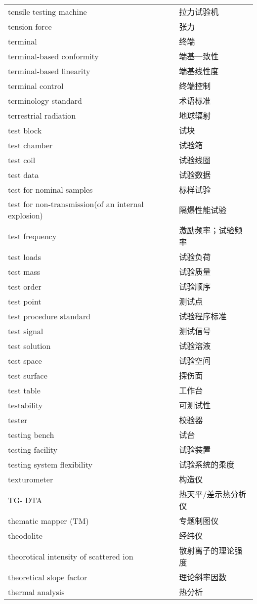 \documentclass[
]{article}
\begin{document}
\begin{longtable}[]{@{}ll@{}}
tensile testing machine & 拉力试验机 \\
tension force & 张力 \\
terminal & 终端 \\
terminal-based conformity & 端基一致性 \\
terminal-based linearity & 端基线性度 \\
terminal control & 终端控制 \\
terminology standard & 术语标准 \\
terrestrial radiation & 地球辐射 \\
test block & 试块 \\
test chamber & 试验箱 \\
test coil & 试验线圈 \\
test data & 试验数据 \\
test for nominal samples & 标样试验 \\
test for non-transmission(of an internal explosion) & 隔爆性能试验 \\
test frequency & 激励频率；试验频率 \\
test loads & 试验负荷 \\
test mass & 试验质量 \\
test order & 试验顺序 \\
test point & 测试点 \\
test procedure standard & 试验程序标准 \\
test signal & 测试信号 \\
test solution & 试验溶液 \\
test space & 试验空间 \\
test surface & 探伤面 \\
test table & 工作台 \\
testability & 可测试性 \\
tester & 校验器 \\
testing bench & 试台 \\
testing facility & 试验装置 \\
testing system flexibility & 试验系统的柔度 \\
texturometer & 构造仪 \\
TG- DTA & 热天平/差示热分析仪 \\
thematic mapper (TM) & 专题制图仪 \\
theodolite & 经纬仪 \\
theorotical intensity of scattered ion & 散射离子的理论强度 \\
theoretical slope factor & 理论斜率因数 \\
thermal analysis & 热分析 \\

\end{longtable}
\end{document}
